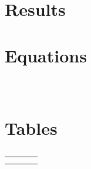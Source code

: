 \documentclass[pdflatex,sn-mathphys-num]{sn-jnl}    %
\theoremstyle{thmstyleone}%
\theoremstyle{thmstyletwo}%
\theoremstyle{thmstylethree}%
\begin{document}
\section{Results}\label{sec:results}

\section{}\label{sec:generic}

\subsection{}\label{subsec:generic}

\subsubsection{}\label{subsubsec:generic}

\section{Equations}\label{sec:equations}

\begin{equation}
\label{eq:1}
\end{equation}

\begin{align}
 &  \nonumber \\
 & \label{eq:2}
\end{align}

\section{Tables}\label{sec:tables}

\begin{table}[h]
\caption{}\label{tab:1}%
\begin{tabular}{@{}llll@{}}
\toprule
 & & & \\
\midrule
 & & & \\
\botrule
\end{tabular}
\end{table}
\end{document}
